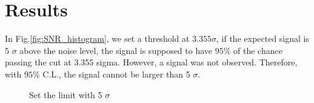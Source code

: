 \section{Results}
In Fig.\ref{fig:SNR_histogram}, we set a threshold at $3.355\sigma$, if the expected signal is 5 $\sigma$ above the noise level, the signal is supposed to have $95\% $ of the chance passing the cut at 3.355 sigma. However, a signal was not observed. Therefore, with $95{\%}$ C.L., the signal cannot be larger than 5 $\sigma$.

\begin{figure}[hbt!]
    \centering
    \caption{Set the limit with 5 $\sigma$}
    \label{fig:limit_5sigma}
\end{figure}


